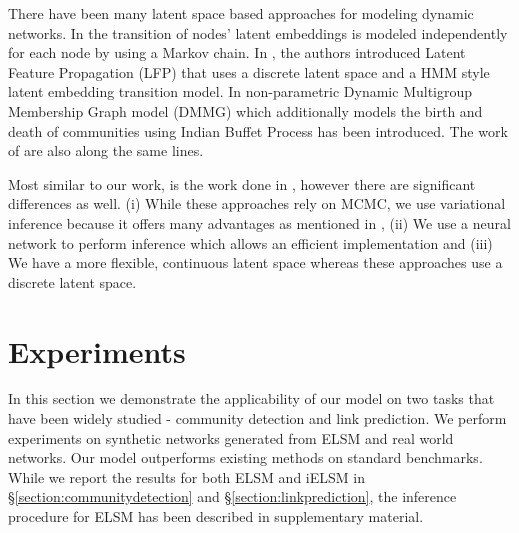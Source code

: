 \documentclass[letterpaper]{article}
\begin{document}
There have been many latent space based approaches for modeling dynamic networks. In \cite{SwellEtAl:2015:LatentSpaceModelsForDynamicNetworks,SwellEtAl:2016:LatentSpaceModelsForDynamicNetworksWithWeightedEdges} the transition of nodes' latent embeddings is modeled independently for each node by using a Markov chain. In \cite{HeaukulaniEtAl:2013:DynamicProbabilisticModelsForLatentFeaturePropagationInSocialNetworks}, the authors introduced Latent Feature Propagation (LFP) that uses a discrete latent space and a HMM style latent embedding transition model. In \cite{KimEtAl:2013:NonparametricMultiGroupMembershipModelForDynamicNetworks} non-parametric Dynamic Multigroup Membership Graph model (DMMG) which additionally models the birth and death of communities using Indian Buffet Process \cite{Griffiths:2011:TheIndianBuffetProcessAnIntroductionAndReview} has been introduced. The work of \cite{MillerEtAl:2009:NonparametricLatentFeatureModelsForLinkPrediction,FouldsEtAl:2011:ADynamicRelationalInfiniteFeatureModelForLongitudinalSocialNetworks} are also along the same lines.

Most similar to our work, is the work done in \cite{HeaukulaniEtAl:2013:DynamicProbabilisticModelsForLatentFeaturePropagationInSocialNetworks,KimEtAl:2013:NonparametricMultiGroupMembershipModelForDynamicNetworks}, however there are significant differences as well. (i) While these approaches rely on MCMC, we use variational inference because it offers many advantages as mentioned in \cite{BleiEtAl:2017:VariationalInferenceAReviewForStatisticians}, (ii) We use a neural network to perform inference which allows an efficient implementation and (iii) We have a more flexible, continuous latent space whereas these approaches use a discrete latent space.



\section{Experiments}
\label{section:experiments}
In this section we demonstrate the applicability of our model on two tasks that have been widely studied - community detection and link prediction. We perform experiments on synthetic networks generated from ELSM and real world networks. Our model outperforms existing methods on standard benchmarks. While we report the results for both ELSM and iELSM in \S \ref{section:communitydetection} and \S \ref{section:linkprediction}, the inference procedure for ELSM has been described in supplementary material.
\end{document}
